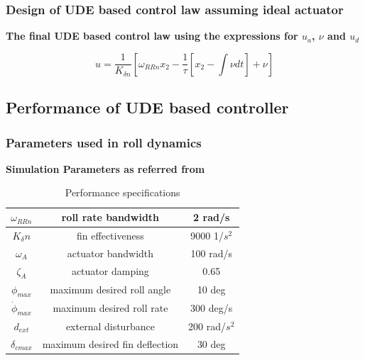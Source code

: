 \documentclass[table,10pt,red]{beamer}	%
\begin{document}
\begin{frame}
\frametitle{Design of UDE based control law assuming ideal actuator}
	\textbf{The final UDE based control law using the expressions for $u_a$, $\nu$ and $u_d$}

\begin{equation*}
u =  \frac{1}{K_{\delta n}}\left[\omega_{RRn}x_2  - \frac{1}{\tau}\left[x_2 - \int \nu dt\right]+\nu\right]
\label{eq11}
\end{equation*}
\end{frame}
\subsection{Performance of UDE based controller}
\begin{frame}
\frametitle{Parameters used in roll dynamics}
\textbf{Simulation Parameters as referred from \cite{talole2011}}
%
\begin{table}[h]
\begin{center}
\caption{Performance specifications}\label{tb1}
\begin{tabular}{ccc}
\hline
$\omega_{RRn}$ & roll rate bandwidth & 2 rad/s\\ \hline
$K_\delta n$ & fin effectiveness & 9000 1/$s^2$\\ \hline
$\omega_A$ & actuator bandwidth & 100 rad/s\\ \hline
$\zeta_A$ & actuator damping & 0.65 \\ \hline
$\phi_{max}$ & maximum desired roll angle & 10 deg\\ \hline
$\dot{\phi}_{max}$ & maximum desired roll rate & 300 deg/s\\ \hline
$d_{ext}$ & external disturbance & 200 rad/$s^2$ \\ \hline
$\delta_{cmax}$ & maximum desired fin deflection & 30 deg \\ \hline


\end{tabular}
\end{center}
\end{table}
\end{frame}
\end{document}
